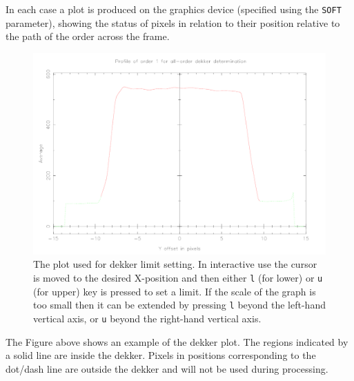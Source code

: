 \documentclass[twoside,11pt,nolof]{starlink}
\newcommand{\sunspec}[2]{#2}
\begin{document}
In each case a plot is produced on the graphics device (specified using
the \texttt{SOFT} parameter), showing the status of pixels in relation to their
position relative to the path of the order across the frame.

\begin{figure}
\begin{center}
\includegraphics[width=\textwidth]{sun152_04}

\parbox{140mm}{
\caption{The plot used for dekker limit setting. In interactive use
the cursor is moved to the desired X-position and then either {\tt l}
(for lower) or {\tt u} (for upper) key is pressed to set a limit. If
the scale of the graph is too small then it can be extended by
pressing {\tt l} beyond the left-hand vertical axis, or {\tt u}
beyond the right-hand vertical axis.}
\label{fi_dekker}
}
\end{center}
\end{figure}

\sunspec{Figure~\ref{fi_dekker}}{The Figure above}
shows an example of the dekker plot. The regions
indicated by a solid line are inside the dekker. Pixels in positions
corresponding to the dot/dash line are outside the dekker and will not
be used during processing.
\end{document}
